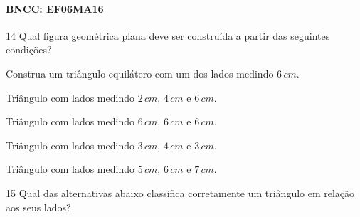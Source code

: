 \paragraph{BNCC: EF06MA16 }


\num{14} Qual figura geométrica plana deve ser construída a partir das
seguintes condições?

Construa um triângulo equilátero com um dos lados medindo $6\,cm$.

\begin{escolha}
\item Triângulo com lados medindo $2\,cm$, $4\,cm$ e $6\,cm$. 
\item Triângulo com lados
medindo $6\,cm$, $6\,cm$ e $6\,cm$. 
\item Triângulo com lados medindo $3\,cm$, $4\,cm$ e $3\,cm$.
\item Triângulo com lados medindo $5\,cm$, $6\,cm$ e $7\,cm$.
\end{escolha}



\num{15} Qual das alternativas abaixo classifica corretamente um triângulo em
relação aos seus lados?

